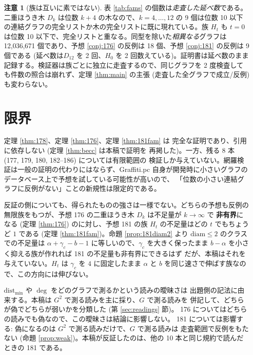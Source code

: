 \documentclass[paper=a4,fontsize=10.5pt,jafontsize=10.5pt]{jlreq}
\theoremstyle{plain}
\theoremstyle{definition}
\newtheorem{remark}[theorem]{注意}
\begin{document}
\begin{remark}[族は互いに素ではない]\label{rem:overlap}
表 \ref{tab:fams} の個数は\emph{走査した延べ数}である。二重ほうき木 $D_k$ は位数 $k + 4$ の木なので、$k = 4, \dots, 12$ の 9 個は位数 10 以下の連結グラフの完全リストか木の完全リストに既に現れている。族 $H_t$ も $t = 0$ は位数 10 以下で、完全リストと重なる。同型を除いた\emph{相異なる}グラフは 12,036,671 個であり、予想 \ref{conj:176} の反例は 18 個、予想 \ref{conj:181} の反例は 9 個である (延べ数は$D_{12}$ を 2 回、$H_{0}$ を 2 回数えている)。証明書は延べ数のまま記録する。検証器は族ごとに独立に走査するので、同じグラフを 2 度検査しても件数の照合は崩れず、定理 \ref{thm:main} の主張 (走査した全グラフで成立/反例) も変わらない。
\end{remark}


\section{限界}

定理 \ref{thm:178}、定理 \ref{thm:176}、定理 \ref{thm:181fam} は
完全な証明であり、引用に依存しない (定理 \ref{thm:becc} は本稿で証明を
再掲した)。一方、残る 8 本 (177, 179, 180, 182--186) については有限範囲の
検証しか与えていない。網羅検証は一般の証明の代わりにはならず、Graffiti.pc
自身が開発時に小さいグラフのデータベース上で予想を試している可能性が高いので、
「位数の小さい連結グラフに反例がない」ことの新規性は限定的である。

反証の側についても、得られたものの強さは一様でない。どちらの予想も反例の
無限族をもつが、予想 176 の二重ほうき木 $D_k$ は不足量が $k \to \infty$ で
\textbf{非有界}になる (定理 \ref{thm:176}) のに対し、予想 181 の族
$H_t$ の不足量はどの $t$ でもちょうど $1$ である (定理
\ref{thm:181fam})。命題 \ref{prop:181diam2} より
$\mathrm{diam} \le 2$ のクラスでの不足量は
$\alpha + \gamma_c - b - 1$ に等しいので、$\gamma_c$ を大きく保ったまま
$b - \alpha$ を小さく抑える族が作れれば 181 の不足量も非有界にできるはず
だが、本稿はそれを与えていない。$H_t$ は $\gamma_c$ を $4$ に固定したまま
$\alpha$ と $b$ を同じ速さで伸ばす族なので、この方向には伸びない。

$\mathrm{dist}_{\min}$ や $\deg$ をどのグラフで測るかという読みの曖昧さは
出題側の記法に由来する。本稿は $G^2$ で測る読みを主に採り、$G$ で測る読みを
併記して、どちらが偽でどちらが弱いかを分類した (第 \ref{sec:readings} 節)。
176 についてはどちらの読みでも偽なので、この曖昧さは結論に影響しない。
181 については影響する: 偽になるのは $G^2$ で測る読みだけで、$G$ で測る読みは
走査範囲で反例をもたない (命題 \ref{prop:weak})。本稿が反証したのは、他の
10 本と同じ規約で読んだときの 181 である。
\end{document}
